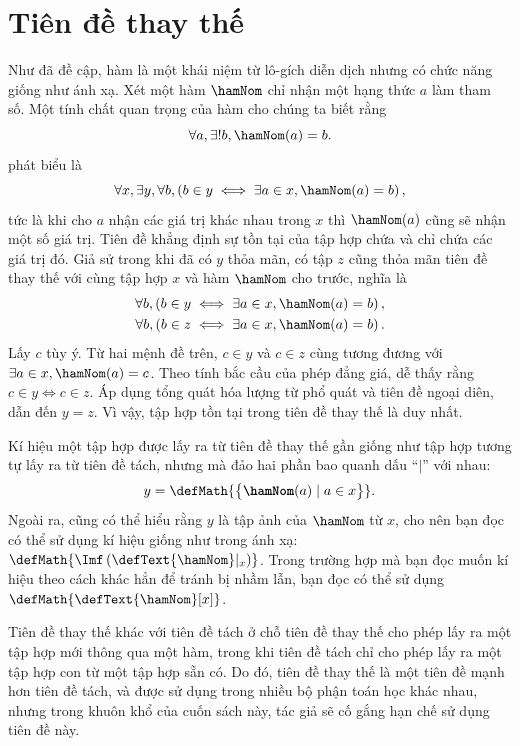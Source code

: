 \section{Tiên đề thay thế}

Như đã đề cập, hàm là một khái niệm từ lô-gích diễn dịch nhưng có chức năng giống như ánh xạ. Xét một hàm $\hamNom$ chỉ nhận một hạng thức $a$ làm tham số. Một tính chất quan trọng của hàm cho chúng ta biết rằng
\begin{equation*}
   \forall a, \exists! b, \hamNom(a) = b.
\end{equation*}
 phát biểu là 
\begin{equation*}
   \forall x, \exists y, \forall b, \left(b \in y \iff \exists a \in x, \hamNom(a) = b\right),
\end{equation*}
tức là khi cho $a$ nhận các giá trị khác nhau trong $x$ thì $\hamNom(a)$ cũng sẽ nhận một số giá trị. Tiên đề khẳng định sự tồn tại của tập hợp chứa và chỉ chứa các giá trị đó. Giả sử trong khi đã có $y$ thỏa mãn, có tập $z$ cũng thỏa mãn tiên đề thay thế với cùng tập hợp $x$ và hàm $\hamNom$ cho trước, nghĩa là 
\begin{align*}
\forall b, \left(b \in y \iff \exists a \in x, \hamNom(a) = b\right), \\
\forall b, \left(b \in z \iff \exists a \in x, \hamNom(a) = b\right).
\end{align*}
Lấy $c$ tùy ý. Từ hai mệnh đề trên, $c \in y$ và $c \in z$ cùng tương đương với $\exists a \in x, \hamNom(a) = c$. Theo tính bắc cầu của phép đẳng giá, dễ thấy rằng $c \in y \iff c \in z$. Áp dụng tổng quát hóa lượng từ phổ quát và tiên đề ngoại diên, dẫn đến $y = z$. Vì vậy, tập hợp tồn tại trong tiên đề thay thế là duy nhất.

Kí hiệu một tập hợp được lấy ra từ tiên đề thay thế gần giống như tập hợp tương tự lấy ra từ tiên đề tách, nhưng mà đảo hai phần bao quanh dấu ``$\mid$'' với nhau:
\begin{equation*}
   y = \defMath{\big\{\text{\textbf{\hamNom}}(a) \mid a \in x\big\}}.
\end{equation*}
Ngoài ra, cũng có thể hiểu rằng $y$ là tập ảnh của $\hamNom$ từ $x$, cho nên bạn đọc có thể sử dụng kí hiệu giống như trong ánh xạ: $\defMath{\Imf\left(\text{\defText{\hamNom}}|_x\right)}$. Trong trường hợp mà bạn đọc muốn kí hiệu theo cách khác hẳn để tránh bị nhầm lẫn, bạn đọc có thể sử dụng $\defMath{\text{\defText{\hamNom}}[x]}$.

Tiên đề thay thế khác với tiên đề tách ở chỗ tiên đề thay thế cho phép lấy ra một tập hợp mới thông qua một hàm, trong khi tiên đề tách chỉ cho phép lấy ra một tập hợp con từ một tập hợp sẵn có. Do đó, tiên đề thay thế là một tiên đề mạnh hơn tiên đề tách, và được sử dụng trong nhiều bộ phận toán học khác nhau, nhưng trong khuôn khổ của cuốn sách này, tác giả sẽ cố gắng hạn chế sử dụng tiên đề này.


